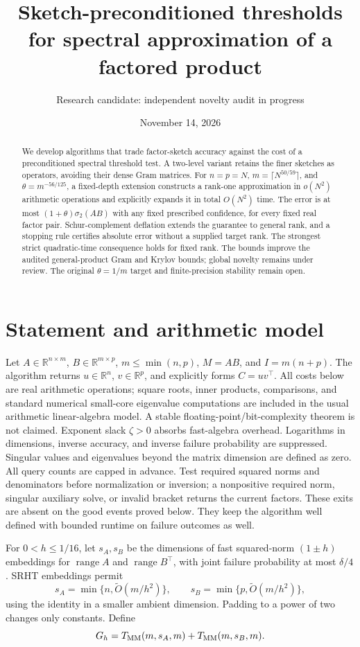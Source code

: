 \documentclass[11pt]{article}
\title{Sketch-preconditioned thresholds\\for spectral approximation of a factored product}
\author{Research candidate: independent novelty audit in progress}
\date{November 14, 2026}
\newcommand{\R}{\mathbb R}
\newcommand{\MM}{T_{\rm MM}}
\newcommand{\tO}{\widetilde O}
\newcommand{\range}{\operatorname{range}}
\begin{document}
\maketitle
\begin{abstract}
We develop algorithms that trade factor-sketch accuracy against the cost
of a preconditioned spectral threshold test. A two-level variant retains
the finer sketches as operators, avoiding their dense Gram matrices.
For \(n=p=N\), \(m=\lceil N^{50/59}\rceil\), and
\(\theta=m^{-56/125}\), a fixed-depth extension constructs a rank-one approximation in
\(o(N^2)\) arithmetic operations and explicitly expands it in total
\(O(N^2)\) time. The error is at most \((1+\theta)\sigma_2(AB)\)
with any fixed prescribed confidence, for every fixed real factor pair.
Schur-complement deflation extends the guarantee to general rank, and a
stopping rule certifies absolute error without a supplied target rank.
The strongest strict quadratic-time consequence holds for fixed rank.
The bounds improve the audited general-product Gram and Krylov bounds;
global novelty remains under review. The original \(\theta=1/m\) target
and finite-precision stability remain open.
\end{abstract}

\section{Statement and arithmetic model}
Let \(A\in\R^{n\times m}\), \(B\in\R^{m\times p}\),
\(m\leq\min(n,p)\), \(M=AB\), and \(I=m(n+p)\).
The algorithm returns \(u\in\R^n\), \(v\in\R^p\), and explicitly
forms \(C=uv^\top\). All costs below are real arithmetic operations;
square roots, inner products, comparisons, and standard numerical small-core
eigenvalue computations are included in the usual arithmetic linear-algebra
model. A stable floating-point/bit-complexity theorem is not claimed.
Exponent slack \(\zeta>0\) absorbs fast-algebra overhead. Logarithms in
dimensions, inverse accuracy, and inverse failure probability are suppressed.
Singular values and eigenvalues beyond the matrix dimension are defined as zero.
All query counts are capped in advance. Test required squared norms and
denominators before normalization or inversion; a nonpositive required norm,
singular auxiliary solve, or invalid bracket returns the current factors.
These exits are absent on the good events proved below. They keep the
algorithm well defined with bounded runtime on failure outcomes as well.

For \(0<h\leq1/16\), let \(s_A,s_B\) be the dimensions of fast
squared-norm \((1\pm h)\) embeddings for \(\range A\) and
\(\range B^\top\), with joint failure probability at most \(\delta/4\).
SRHT embeddings permit
\[
 s_A=\min\{n,\tO(m/h^2)\},\qquad
 s_B=\min\{p,\tO(m/h^2)\},
\]
using the identity in a smaller ambient dimension. Padding to a power of two
changes only constants. Define
\[
 G_h=\MM(m,s_A,m)+\MM(m,s_B,m).
\]
\end{document}
